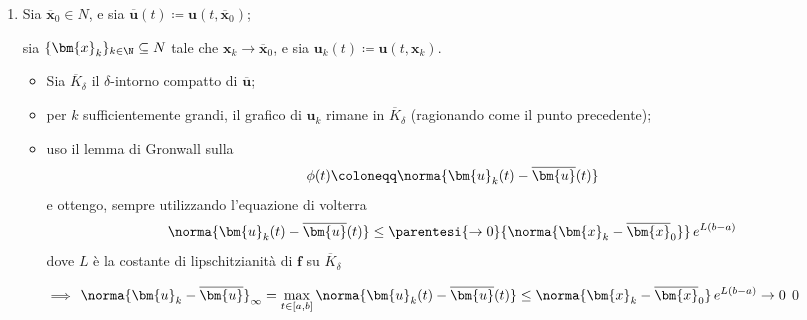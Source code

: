 {\begin{enumerate}
        Sfruttiamo il fatto che $ \bm{u}_0 $ e $ \bm{u}_{ \varepsilon} $ siano le soluzioni di problemi di Cauchy e usiamo le loro equazioni di Volterra. \[
            \bm{u}_{ \varepsilon} (t) =\bm{u}_{ \varepsilon} (a) + \int_{a}^{t} \bm{f}\left(s, \bm{u}_{ \varepsilon}(s)\right) \,ds
        \]Definiamo ora, per ogni $ t \in [a,t_{ \varepsilon} ] $, la funzione \begin{align*}
            \phi(t) &= \norma{\bm{u}_{ \varepsilon}(t)-\bm{u}_{ 0}(t)}\\ &= \norma{%
            \bm{u}_{ \varepsilon}(a) + \int_{a}^{t} \bm{f}\left(s,\bm{u}_{ \varepsilon}(s)\right) \,ds - \bm{u}_0 - \int_{a}^{t} \bm{f}\left(s, \bm{u}_0(s)\right)\,ds 
            }\\ 
            &\le \norma{\bm{u}_{ \varepsilon}(a)-\bm{u}_0(a)} + \int_{a}^{t}\norma{\bm{f}\left(s, \bm{u}_{ \varepsilon}(s)\right) - \bm{f}\left(s, \bm{u}_0(s)\right)}\,ds \\ 
            &\underset{\footnotemark}{\le} \parentesi{A_{ \varepsilon} }{%
                \norma{\bm{x}_{ \varepsilon} -\bm{x}_0} 
            } + L\,\int_{0}^{t}\norma{\bm{u}_{ \varepsilon}(s) - \bm{u}_0(s)}\,ds .
        \end{align*} 

        Dunque, per il lemma di Gronwall, $ \displaystyle \phi(t)\le A_{ \varepsilon}\, e^{L(t-a)}  $. Inoltre, $ \phi(t_{ \varepsilon} ) = \delta $, e si ha che \[
            0< \delta \le A_{ \varepsilon} \, e^{L(t_{ \varepsilon} -a)} \longrightarrow 0 
        \]che è assurdo.
        \item Sia $ \overline{\bm{x}}_0 \in N $, e sia $ \overline{\bm{u}}(t)\coloneqq \bm{u}(t,\overline{\bm{x}}_0) $; 
        
        sia $ \{\bm{x}_{k} \}_{k \in \N} \subseteq N$ tale che $ \bm{x}_k\longrightarrow \overline{\bm{x}}_0 $, e sia $ \bm{u}_k (t)\coloneqq \bm{u}(t,\bm{x}_k)$.\begin{itemize}
            \item Sia $ \overline{K}_{\delta} $ il $ \delta $-intorno compatto di $ \overline{\bm{u}} $;
            \item per $ k $ sufficientemente grandi, il grafico di $ \bm{u}_k $ rimane in $ \overline{K}_{\delta} $ (ragionando come il punto precedente);
            \item uso il lemma di Gronwall sulla \[
                \phi(t)\coloneqq\norma{\bm{u}_k(t)-\overline{\bm{u}}(t)}
            \]e ottengo, sempre utilizzando l'equazione di volterra \[
                \norma{\bm{u}_k(t)-\overline{\bm{u}}(t)} \le \parentesi{\to 0}{\norma{\bm{x}_k-\overline{\bm{x}}_0}}\,e^{L(b-a)}
            \]dove $ L $ è la costante di lipschitzianità di $ \bm{f} $ su $ \overline{K}_{\delta} $ 
            
            $\implies$ $\displaystyle \norma{\bm{u}_k-\overline{\bm{u}}}_{\infty} = \max_{t \in [a,b]} \norma{\bm{u}_k(t)-\overline{\bm{u}}(t)}\le \norma{\bm{x}_k-\overline{\bm{x}}_0}\,e^{L(b-a)}\to 0  $\qed
        \end{itemize}
    \end{enumerate}
}
